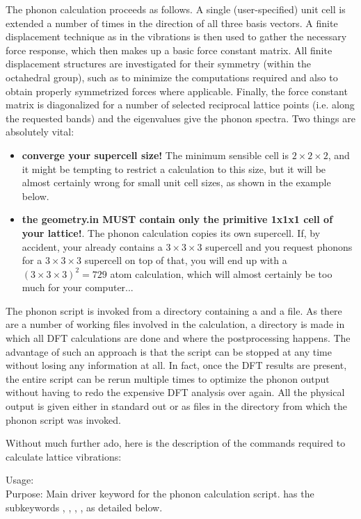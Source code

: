 The phonon calculation proceeds as follows. A single (user-specified) unit cell is
extended a number of times in the direction of all three basis
vectors. A finite displacement technique as in the vibrations is then
used to gather the necessary force response, which then makes up a
basic force constant matrix. All finite displacement structures are
investigated for their symmetry (within the octahedral group), such as
to minimize the computations required and also to obtain properly
symmetrized forces where applicable. Finally, the force constant matrix is
diagonalized for a number of selected reciprocal lattice points
(i.e. along the requested bands) and the eigenvalues give the phonon
spectra. Two things are absolutely vital:
\begin{itemize}
\item {\bf converge your supercell size!} The minimum sensible cell
  is $2\times 2\times 2$, and it might be tempting to restrict a
  calculation to this size, but it will be almost certainly wrong for
  small unit cell sizes, as shown in the example below.
\item {\bf the geometry.in MUST contain only the primitive 1x1x1 cell
  of your lattice!}. The phonon calculation copies its own
  supercell. If, by accident, your  already
  contains a $3\times3\times3$ supercell and you request phonons for a $3\times3\times3$
  supercell on top of that, you will end up with a
  $(3\times3\times3)^2=729$ atom calculation, which will almost
  certainly be too much for your computer... 
\end{itemize}
The phonon script is invoked from a directory containing a
 and a  file. As there are a
number of working files involved in the calculation, a directory
 is made in which all DFT calculations are
done and where the postprocessing happens. The advantage of such an
approach is that the script can be stopped at any time without losing
any information at all. In fact, once the DFT results are present, the
entire script can be rerun multiple times to optimize the phonon
output without having to redo the expensive DFT analysis over again. 
All the physical output is given either in standard out or as files
in the directory from which the phonon script was invoked. 

Without much further ado, here is the description of the commands
required to calculate lattice vibrations:

{
  Usage:  \\[1.0em]
  Purpose: Main driver keyword for the phonon calculation script. has
  the subkeywords ,
  , ,
  , as detailed below.\\ }

